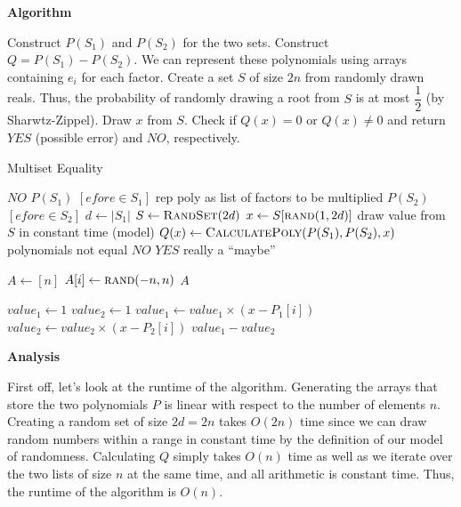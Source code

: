 \documentclass{article}
\begin{document}
\textbf{Algorithm}

Construct $P(S_1)$ and $P(S_2)$ for the two sets. Construct $Q = P(S_1) - P(S_2)$. We can represent these polynomials
using arrays containing $e_i$ for each factor. Create a set $S$ of size $2n$ from randomly drawn reals. Thus, the
probability of randomly drawing a root from $S$ is at most $\dfrac{1}{2}$ (by Sharwtz-Zippel). Draw $x$ from $S$. Check
if $Q(x) = 0$ or $Q(x) \neq 0$ and return $YES$ (possible error) and $NO$, respectively.

\begin{algorithm}
    \caption{Multiset Equality}\label{euclid}
    \begin{algorithmic}[1]
         \Return $NO$ \EndIf
        \State $P(S_1)$ \gets $[e for e \in S_1]$  \Comment rep poly as list of factors to be multiplied
        \State $P(S_2)$ \gets $[e for e \in S_2]$
        \State $d \gets |S_1|$
        \State $S \gets \Call{RandSet}{2d}$
        \State $x \gets S[\Call{rand}{1, 2d}]$     \Comment draw value from $S$ in constant time (model)
        \State $Q(x) \gets \Call{CalculatePoly}{P(S_1), P(S_2), x}$
                                 \Comment polynomials not equal
            \State \Return $NO$
        \EndIf
        \State \Return $YES$                        \Comment really a ``maybe''
    \end{algorithmic}

    \begin{algorithmic}[1]
        \State $A \gets [n]$
            \State $A[i] \gets \Call{rand}{-n, n}$
        \EndFor
        \State \Return $A$
    \end{algorithmic}

    \begin{algorithmic}[1]
        \State $value_1 \gets 1$
        \State $value_2 \gets 1$
            \State $value_1 \gets value_1 \times (x - P_1[i])$
            \State $value_2 \gets value_2 \times (x - P_2[i])$
        \EndFor
        \State \Return $value_1 - value_2$
    \end{algorithmic}
\end{algorithm}


\textbf{Analysis}

First off, let's look at the runtime of the algorithm. Generating the arrays that store the two polynomials $P$ is
linear with respect to the number of elements $n$. Creating a random set of size $2d = 2n$ takes $O(2n)$ time since we
can draw random numbers within a range in constant time by the definition of our model of randomness. Calculating $Q$
simply takes $O(n)$ time as well as we iterate over the two lists of size $n$ at the same time, and all arithmetic is
constant time. Thus, the runtime of the algorithm is $O(n)$.
\end{document}
